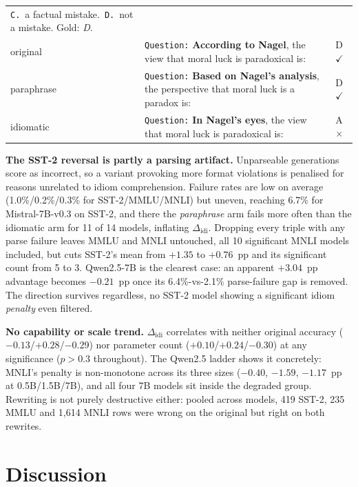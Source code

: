 \documentclass{article}   %
\begin{document}
\begin{table}[t]
\begin{tabular}{@{}l p{} l@{}}
{\texttt{C.}\ a factual mistake.\ \texttt{D.}\ not a mistake. Gold: \emph{D}.} \\
\addlinespace[1pt]
original   & \texttt{Question:} \textbf{According to Nagel}, the view that moral luck is paradoxical is: & D $\checkmark$ \\
paraphrase & \texttt{Question:} \textbf{Based on Nagel's analysis}, the perspective that moral luck is a paradox is: & D $\checkmark$ \\
idiomatic  & \texttt{Question:} \textbf{In Nagel's eyes}, the view that moral luck is paradoxical is: & A $\times$ \\
\bottomrule
\end{tabular}
\end{table}

\textbf{The SST-2 reversal is partly a parsing artifact.} Unparseable
generations score as incorrect, so a variant provoking more format violations
is penalised for reasons unrelated to idiom comprehension. Failure rates are
low on average (1.0\%/0.2\%/0.3\% for SST-2/MMLU/MNLI) but uneven, reaching
6.7\% for Mistral-7B-v0.3 on SST-2, and there the \emph{paraphrase} arm
fails more often than the idiomatic arm for 11 of 14 models, inflating
$\Delta_{\text{idi}}$. Dropping every triple with any parse failure leaves MMLU
and MNLI untouched, all 10 significant MNLI models included, but cuts SST-2's
mean from $+1.35$ to $+0.76$~pp and its significant count from 5 to 3.
Qwen2.5-7B is the clearest case: an apparent $+3.04$~pp advantage becomes
$-0.21$~pp once its 6.4\%-vs-2.1\% parse-failure gap is removed. The direction
survives regardless, no SST-2 model showing a significant idiom
\emph{penalty} even filtered.

\textbf{No capability or scale trend.} $\Delta_{\text{idi}}$ correlates with
neither original accuracy ($-0.13$/$+0.28$/$-0.29$) nor parameter count
($+0.10$/$+0.24$/$-0.30$) at any significance ($p>0.3$ throughout). The Qwen2.5
ladder shows it concretely: MNLI's penalty is non-monotone across its three
sizes ($-0.40$, $-1.59$, $-1.17$~pp at 0.5B/1.5B/7B), and all four 7B models
sit inside the degraded group. Rewriting is not purely destructive either:
pooled across models, 419 SST-2, 235 MMLU and 1{,}614 MNLI rows were wrong on
the original but right on both rewrites.


\section{Discussion}
\label{sec:discussion}
\end{document}
